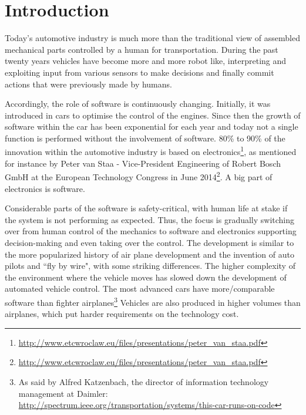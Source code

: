 \documentclass[preprint,12pt,3p]{elsarticle}
\newcommand\patrizio[1]{\nb{Patrizio}{#1}}
\newcommand\eric[1]{\nb{Eric}{#1}}
\begin{document}

\section{Introduction}
\label{sec:intro}
Today's automotive industry is much more than the traditional view of assembled
mechanical parts controlled by a human for transportation. During the past
twenty years vehicles have become more and more robot like, interpreting and
exploiting input from various sensors to make decisions and finally commit
actions that were previously made by humans.  

Accordingly, the role of software is continuously changing. Initially, it was introduced in cars to optimise the
control of the engines. Since then the growth of software within the car has
been exponential for each year and today not a single function is performed
without the involvement of software. 
80\% to 90\% of the innovation within the automotive industry is based on electronics\footnote{\url{http://www.etcwroclaw.eu/files/presentations/peter_van_staa.pdf}}, 
as mentioned for instance by Peter van Staa - Vice-President Engineering of Robert Bosch GmbH at the European Technology Congress in June 2014\footnote{\url{http://www.etcwroclaw.eu/files/presentations/peter_van_staa.pdf}}. 
A big part of electronics is software.

Considerable parts of the
software is safety-critical, with human life at stake if the system is not performing as
expected. Thus, the focus is gradually switching over from human control of the
mechanics to software and electronics supporting decision-making and even taking
over the control. 
The development is similar to the more popularized history of
air plane development and the invention of auto pilots and ``fly by wire", with
some striking differences. The higher complexity of the environment where the
vehicle moves has slowed down the development of automated vehicle control. The
most advanced cars have more/comparable software than fighter
airplanes\footnote{As said by Alfred Katzenbach, the director of information technology management at Daimler: \url{http://spectrum.ieee.org/transportation/systems/this-car-runs-on-code}}
Vehicles are also produced in higher volumes than airplanes, which put harder requirements on the technology cost.
\end{document}
